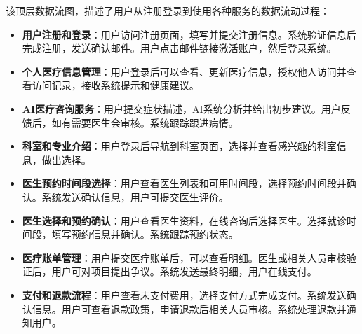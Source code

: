 该顶层数据流图，描述了用户从注册登录到使用各种服务的数据流动过程：
\begin{itemize}
	\item \textbf{用户注册和登录}：用户访问注册页面，填写并提交注册信息。系统验证信息后完成注册，发送确认邮件。用户点击邮件链接激活账户，然后登录系统。
	\item \textbf{个人医疗信息管理}：用户登录后可以查看、更新医疗信息，授权他人访问并查看访问记录，接收系统提示和健康建议。
	\item \textbf{AI医疗咨询服务}：用户提交症状描述，AI系统分析并给出初步建议。用户反馈后，如有需要医生会审核。系统跟踪跟进病情。
	\item \textbf{科室和专业介绍}：用户登录后导航到科室页面，选择并查看感兴趣的科室信息，做出选择。
	\item \textbf{医生预约时间段选择}：用户查看医生列表和可用时间段，选择预约时间段并确认。系统发送确认信息，用户可提交医生评价。
	\item \textbf{医生选择和预约确认}：用户查看医生资料，在线咨询后选择医生。选择就诊时间段，填写预约信息并确认。系统跟踪预约状态。
	\item \textbf{医疗账单管理}：用户提交医疗账单后，可以查看明细。医生或相关人员审核验证后，用户可对项目提出争议。系统发送最终明细，用户在线支付。
	\item \textbf{支付和退款流程}：用户查看未支付费用，选择支付方式完成支付。系统发送确认信息。用户可查看退款政策，申请退款后相关人员审核。系统处理退款并通知用户。
\end{itemize}

